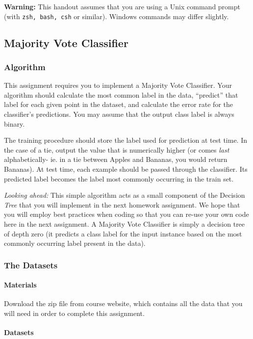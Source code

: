 \documentclass[11pt,addpoints,answers]{exam}
\begin{document}
\textbf{Warning:} This handout assumes that you are using a Unix command prompt (with \texttt{zsh, bash, csh} or similar). Windows commands may differ slightly.

\subsection{Majority Vote Classifier}

\subsubsection{Algorithm}


This assignment requires you to implement a Majority Vote Classifier.  Your algorithm should calculate the most common label in the data, ``predict'' that label for each given point in the dataset, and calculate the error rate for the classifier's predictions. You may assume that the output class label is always binary. 

The training procedure should store the label used for prediction at test time. In the case of a tie, output the value that is numerically higher (or comes \emph{last} alphabetically- ie. in a tie between Apples and Bananas, you would return Bananas). At test time, each example should be passed through the classifier. Its predicted label becomes the label most commonly occurring in the train set. 

\emph{Looking ahead:} This simple algorithm acts as a small component of the Decision \emph{Tree} that you will implement in the next homework assignment. We hope that you will employ best practices when coding so that you can re-use your own code here in the next assignment. A Majority Vote Classifier is simply a decision tree of depth zero (it predicts a class label for the input instance based on the most commonly occurring label present in the data).

\subsubsection{The Datasets}
\label{sec:data}

\paragraph{Materials} Download the zip file from course website, which contains all the data that you will need in order to complete this assignment.

\paragraph{Datasets}
\end{document}
